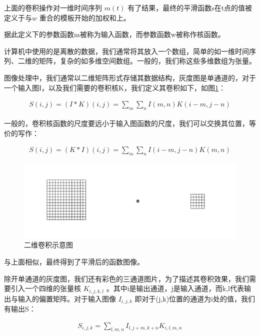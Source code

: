上面的卷积操作对一维时间序列 $ m(t) $ 有了结果，最终的平滑函数s在t点的值被定义于与$ w $ 重合的模板开始的加权和上。

据此定义下的参数函数m被称为输入函数，而参数函数w被称作核函数。

计算机中使用的是离散的数据，我们通常将其放入一个数组，简单的如一维时间序列、二维的矩阵，复杂的如多维空间数组。一般的，我们称这些多维数组为张量。

图像处理中，我们通常以二维矩阵形式存储其数据结构，灰度图是单通道的，对于一个输入图I，以及我们需要的卷积核K，我们定义其卷积如下，如图\ref{fig:con-2D}：

\begin{eqnarray}
    S(i,j) = (I \ast K)(i,j) = \sum_{m} \sum_n I(m,n)K(i-m,j-n)
\end{eqnarray}

一般的，卷积核函数的尺度要远小于输入图函数的尺度，我们可以交换其位置，等价的写作：

\begin{eqnarray}
    S(i,j) = (K \ast I)(i,j) = \sum_{m} \sum_{n} I(i-m,j-n)K(m,n)
\end{eqnarray}

\begin{figure}[!tbp]
    \centering
    \includegraphics[width=\textwidth]{figures/con-2D.png}
    \caption{二维卷积示意图}
    \vspace{-1em}
    \label{fig:con-2D}
\end{figure}

与上面相似，最终得到了平滑后的函数图像。


除开单通道的灰度图，我们还有彩色的三通道图片，为了描述其卷积效果，我们需要引入一个四维的张量核 $ K_{i,j,k,l} $ 。其中i是输出通道，j是输入通道，而k,l代表输出与输入的偏置矩阵。对于输入图像 $ I_{i,j,k} $ 即对于(j,k)位置的通道为i处的值，我们有输出S：

\begin{eqnarray}
    S_{i,j,k} = \sum_{l,m,n}I_{l,j+m,k+n}K_{i,l,m,n}
\end{eqnarray}


